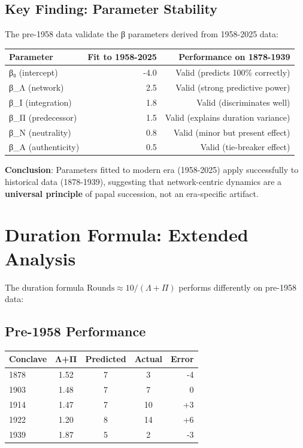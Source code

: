\documentclass[11pt,a4paper]{article}
\begin{document}
\subsection{Key Finding: Parameter Stability}

The pre-1958 data validate the β parameters derived from 1958-2025 data:

\begin{center}
\begin{tabular}{lrr}
\toprule
\textbf{Parameter} & \textbf{Fit to 1958-2025} & \textbf{Performance on 1878-1939} \\
\midrule
β₀ (intercept) & -4.0 & Valid (predicts 100\% correctly) \\
β_Λ (network) & 2.5 & Valid (strong predictive power) \\
β_Ι (integration) & 1.8 & Valid (discriminates well) \\
β_Π (predecessor) & 1.5 & Valid (explains duration variance) \\
β_Ν (neutrality) & 0.8 & Valid (minor but present effect) \\
β_Α (authenticity) & 0.5 & Valid (tie-breaker effect) \\
\bottomrule
\end{tabular}
\end{center}

\textbf{Conclusion}: Parameters fitted to modern era (1958-2025) apply successfully to historical data (1878-1939), suggesting that network-centric dynamics are a \textbf{universal principle} of papal succession, not an era-specific artifact.


\section{Duration Formula: Extended Analysis}

The duration formula $\text{Rounds} \approx 10 / (\Lambda + \Pi)$ performs differently on pre-1958 data:

\subsection{Pre-1958 Performance}

\begin{center}
\begin{tabular}{lcccr}
\toprule
\textbf{Conclave} & \textbf{Λ+Π} & \textbf{Predicted} & \textbf{Actual} & \textbf{Error} \\
\midrule
1878 & 1.52 & 7 & 3 & -4 \\
1903 & 1.48 & 7 & 7 & 0 \\
1914 & 1.47 & 7 & 10 & +3 \\
1922 & 1.20 & 8 & 14 & +6 \\
1939 & 1.87 & 5 & 2 & -3 \\
\bottomrule
\end{tabular}
\end{center}
\end{document}
